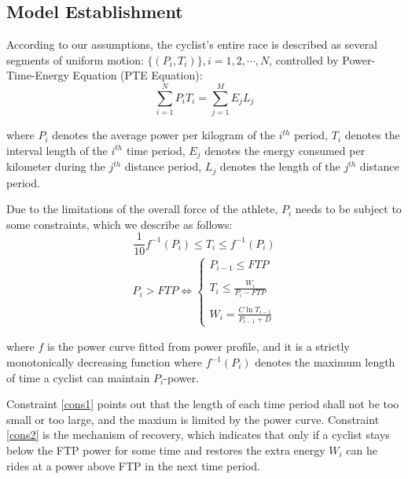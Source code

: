 \subsection{Model Establishment}
\par According to our assumptions, the cyclist's entire race is described as several segments of uniform motion: $\{(P_i,T_i)\},i=1,2,\cdots,N$, controlled by Power-Time-Energy Equation (PTE Equation):
\begin{equation}\label{PTE}
	\sum_{i=1}^N P_iT_i=\sum_{j=1}^M E_jL_j
\end{equation}
\par where $P_i$ denotes the average power per kilogram of the $i^{th}$ period, $T_i$ denotes the interval length of the $i^{th}$ time period, $E_j$ denotes the energy consumed per kilometer during the $j^{th}$ distance period, $L_j$ denotes the length of the $j^{th}$ distance period.
\par Due to the limitations of the overall force of the athlete, $P_i$ needs to be subject to some constraints, which we describe as follows:
\begin{equation}\label{cons1}
\frac{1}{10} f^{-1}(P_i)\leq T_i \leq f^{-1}(P_i)
	\end{equation}
\begin{equation}\label{cons2}
	\begin{split}
		P_i > FTP \Leftrightarrow \left\{
	\begin{array}{rcl}
		P_{i-1}\leq FTP\\
		\quad \\
		T_{i} \leq \frac{W_i}{P_i-FTP}\\
		\quad\\
		W_i=\frac{C\ln T_{i-1}}{P_{i-1}+D}
	\end{array} \right.
\end{split}
\end{equation}

\par where $f$ is the power curve fitted from power profile, and it is a strictly monotonically decreasing function where $f^{-1}(P_i)$ denotes the maximum length of time a cyclist can maintain $P_i$-power.

\par Constraint \ref{cons1} points out that the length of each time period shall not be too small or too large, and the maxium is limited by the power curve. Constraint \ref{cons2} is the mechanism of recovery, which indicates that only if a cyclist stays below the FTP power for some time and restores the extra energy $W_i$ can he rides at a power above FTP in the next time period.

